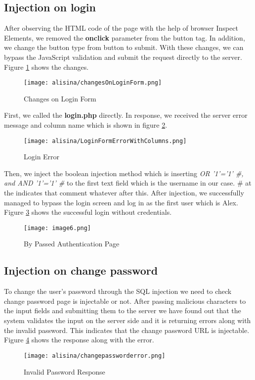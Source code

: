\subsection{Injection on login}
After observing the HTML code of the page with the help of browser Inspect Elements, we removed the \textbf{onclick} parameter from the button tag. 
In addition, we change the button type from button to submit. 
With these changes, we can bypass the JavaScript validation and submit the request directly to the server. Figure \ref{fig:loginFormChanges} shows the changes.
\begin{figure}[H]
    \centering
    \texttt{[image: alisina/changesOnLoginForm.png]}
    \caption{Changes on Login Form}
    \label{fig:loginFormChanges}
\end{figure}
First, we called the \textbf{login.php} directly. In response, we received the server error message and column name which is shown in figure \ref{fig:LoginFormErrorWithColumns}.
\begin{figure}[H]
    \centering
    \texttt{[image: alisina/LoginFormErrorWithColumns.png]}
    \caption{Login Error}
    \label{fig:LoginFormErrorWithColumns}
\end{figure}

Then, we inject the boolean injection method which is inserting \textit{OR '1'='1' \#, and AND '1'='1' \#} to the first text field which is the username in our case. \# at the indicates that comment whatever after this.
After injection, we successfully managed to bypass the login screen and log in as the first user which is Alex. 
Figure \ref{fig:loggedInUser} shows the successful login without credentials.

\begin{figure}[H]
    \centering
    \texttt{[image: image6.png]}
    \caption{By Passed Authentication Page}
    \label{fig:loggedInUser}
\end{figure}

\subsection{Injection on change password}
To change the user's password through the SQL injection we need to check change password page is injectable or not.
After passing malicious characters to the input fields and submitting them to the server we have found out that the system validates the input on the server side and it is returning errors along with the invalid password. 
This indicates that the change password URL is injectable. Figure \ref{fig:invalidPasswordResponse} shows the response along with the error.
\begin{figure}[H]
    \centering
    \texttt{[image: alisina/changepassworderror.png]}
    \caption{Invalid Password Response}
    \label{fig:invalidPasswordResponse}
\end{figure}

